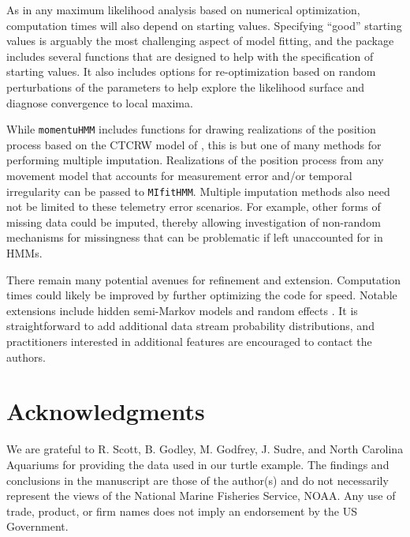 \documentclass[12pt]{article}\usepackage[]{graphicx}\usepackage[]{color}
\begin{document}
As in any maximum likelihood analysis based on numerical optimization, computation times will also depend on starting values. Specifying ``good'' starting values is arguably the most challenging aspect of model fitting, and the package includes several functions that are designed to help with the specification of starting values. It also includes options for re-optimization based on random perturbations of the parameters to help explore the likelihood surface and diagnose convergence to local maxima. %

While \verb|momentuHMM| includes functions for drawing realizations of the position process based on the CTCRW model of \cite{JohnsonEtAl2008}, this is but one of many methods for performing multiple imputation. Realizations of the position process from any movement model that accounts for measurement error and/or temporal irregularity \citep[e.g.][]{CalabreseEtAl2016} can be passed to \verb|MIfitHMM|. Multiple imputation methods also need not be limited to these telemetry error scenarios. For example, other forms of missing data could be imputed, thereby allowing investigation of non-random mechanisms for missingness that can be problematic if left unaccounted for in HMMs.

There remain many potential avenues for refinement and extension. Computation times could likely be improved by further optimizing the code for speed. Notable extensions include hidden semi-Markov models and random effects %
\citep{ZucchiniEtAl2016}. %
It is straightforward to add additional data stream probability distributions, and practitioners interested in additional features are encouraged to contact the authors.

\section*{Acknowledgments}
\noindent We are grateful to R. Scott, B. Godley, M. Godfrey, J. Sudre, and North Carolina Aquariums for providing the data used in our turtle example. The findings and conclusions in the manuscript are those of the author(s) and do not necessarily represent the views of the National Marine Fisheries Service, NOAA. Any use of trade, product, or firm names does not imply an endorsement by the US Government.
\end{document}
